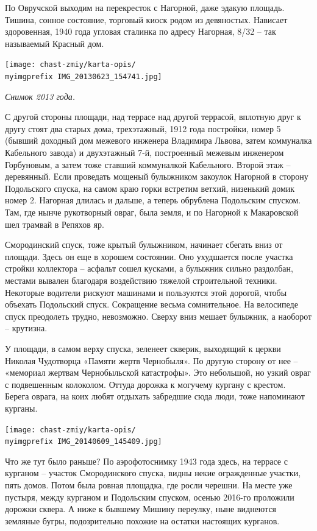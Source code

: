По Овручской выходим на перекресток с Нагорной, даже эдакую площадь. Тишина, сонное состояние, торговый киоск родом из девяностых. Нависает здоровенная, 1940 года угловая сталинка по адресу Нагорная, 8/32 – так называемый Красный дом.

\begin{center}
\texttt{[image: chast-zmiy/karta-opis/\\myimgprefix IMG\_20130623\_154741.jpg]}

\textit{Снимок 2013 года.}
\end{center}

С другой стороны площади, над террасе над другой террасой, вплотную друг к другу стоят два старых дома, трехэтажный, 1912 года постройки, номер 5 (бывший доходный дом межевого инженера Владимира Львова, затем коммуналка Кабельного завода) и двухэтажный 7-й, построенный межевым инженером Горбуновым, а затем тоже ставший коммуналкой Кабельного. Второй этаж – деревянный. Если проведать мощеный булыжником закоулок Нагорной в сторону Подольского спуска, на самом краю горки встретим ветхий, низенький домик номер 2. Нагорная длилась и дальше, а теперь обрублена Подольским спуском. Там, где нынче рукотворный овраг, была земля, и по Нагорной к Макаровской шел трамвай в Репяхов яр.

Смородинский спуск, тоже крытый булыжником, начинает сбегать вниз от площади. Здесь он еще в хорошем состоянии. Оно ухудшается после участка стройки коллектора – асфальт сошел кусками, а булыжник сильно раздолбан, местами вывален благодаря воздействию тяжелой строительной техники. Некоторые водители рискуют машинами и пользуются этой дорогой, чтобы объехать Подольский спуск. Сокращение весьма сомнительное. На велосипеде спуск преодолеть трудно, невозможно. Сверху вниз мешает булыжник, а наоборот – крутизна.

У площади, в самом верху спуска, зеленеет скверик, выходящий к церкви Николая Чудотворца «Памяти жертв Чернобыля». По другую сторону от нее – «мемориал жертвам Чернобыльской катастрофы». Это небольшой, но узкий овраг с подвешенным колоколом. Оттуда дорожка к могучему кургану с крестом. Берега оврага, на коих любят отдыхать забредшие сюда люди, тоже напоминают курганы.

\begin{center}
\texttt{[image: chast-zmiy/karta-opis/\\myimgprefix IMG\_20140609\_145409.jpg]}
\end{center}

Что же тут было раньше? По аэрофотоснимку 1943 года здесь, на террасе с курганом – участок Смородинского спуска, видны некие огражденные участки, пять домов. Потом была ровная площадка, где росли черешни. На месте уже пустыря, между курганом и Подольским спуском, осенью 2016-го проложили дорожки сквера. А ниже к бывшему Мишину переулку, ныне виднеются земляные бугры, подозрительно похожие на остатки настоящих курганов.


